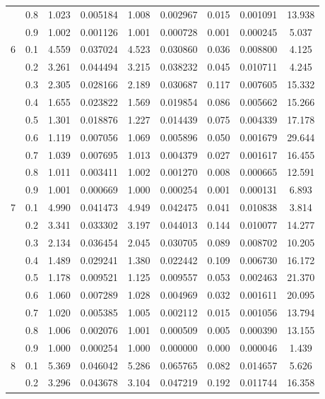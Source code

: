 \begin{longtable}{ | c | c || c | c | c | c | c | c | c | }
 & 0.8 & 1.023 & 0.005184 & 1.008 & 0.002967 & 0.015 & 0.001091 & 13.938 \\
 & 0.9 & 1.002 & 0.001126 & 1.001 & 0.000728 & 0.001 & 0.000245 & 5.037 \\
 \hline
\multirow{9}{*}{6} & 0.1 & 4.559 & 0.037024 & 4.523 & 0.030860 & 0.036 & 0.008800 & 4.125 \\
 & 0.2 & 3.261 & 0.044494 & 3.215 & 0.038232 & 0.045 & 0.010711 & 4.245 \\
 & 0.3 & 2.305 & 0.028166 & 2.189 & 0.030687 & 0.117 & 0.007605 & 15.332 \\
 & 0.4 & 1.655 & 0.023822 & 1.569 & 0.019854 & 0.086 & 0.005662 & 15.266 \\
 & 0.5 & 1.301 & 0.018876 & 1.227 & 0.014439 & 0.075 & 0.004339 & 17.178 \\
 & 0.6 & 1.119 & 0.007056 & 1.069 & 0.005896 & 0.050 & 0.001679 & 29.644 \\
 & 0.7 & 1.039 & 0.007695 & 1.013 & 0.004379 & 0.027 & 0.001617 & 16.455 \\
 & 0.8 & 1.011 & 0.003411 & 1.002 & 0.001270 & 0.008 & 0.000665 & 12.591 \\
 & 0.9 & 1.001 & 0.000669 & 1.000 & 0.000254 & 0.001 & 0.000131 & 6.893 \\
 \hline
\multirow{9}{*}{7} & 0.1 & 4.990 & 0.041473 & 4.949 & 0.042475 & 0.041 & 0.010838 & 3.814 \\
 & 0.2 & 3.341 & 0.033302 & 3.197 & 0.044013 & 0.144 & 0.010077 & 14.277 \\
 & 0.3 & 2.134 & 0.036454 & 2.045 & 0.030705 & 0.089 & 0.008702 & 10.205 \\
 & 0.4 & 1.489 & 0.029241 & 1.380 & 0.022442 & 0.109 & 0.006730 & 16.172 \\
 & 0.5 & 1.178 & 0.009521 & 1.125 & 0.009557 & 0.053 & 0.002463 & 21.370 \\
 & 0.6 & 1.060 & 0.007289 & 1.028 & 0.004969 & 0.032 & 0.001611 & 20.095 \\
 & 0.7 & 1.020 & 0.005385 & 1.005 & 0.002112 & 0.015 & 0.001056 & 13.794 \\
 & 0.8 & 1.006 & 0.002076 & 1.001 & 0.000509 & 0.005 & 0.000390 & 13.155 \\
 & 0.9 & 1.000 & 0.000254 & 1.000 & 0.000000 & 0.000 & 0.000046 & 1.439 \\
 \hline
\multirow{9}{*}{8} & 0.1 & 5.369 & 0.046042 & 5.286 & 0.065765 & 0.082 & 0.014657 & 5.626 \\
 & 0.2 & 3.296 & 0.043678 & 3.104 & 0.047219 & 0.192 & 0.011744 & 16.358 \\

\end{longtable}
